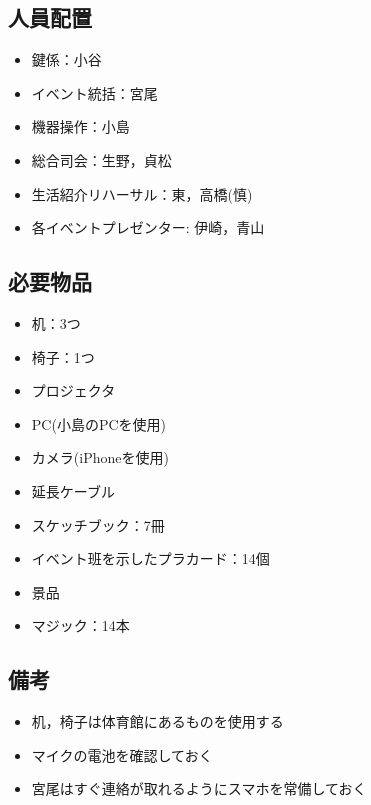 \subsection{人員配置}
\begin{itemize}
\item 鍵係：小谷
\item イベント統括：宮尾
\item 機器操作：小島
\item 総合司会：生野，貞松
\item 生活紹介リハーサル：東，高橋(慎)
\item 各イベントプレゼンター: 伊崎，青山
\end{itemize}




\subsection{必要物品}
\begin{itemize}
\item 机：3つ
\item 椅子：1つ
\item プロジェクタ
\item PC(小島のPCを使用)
\item カメラ(iPhoneを使用)
\item 延長ケーブル
\item スケッチブック：7冊
\item イベント班を示したプラカード：14個
\item 景品
\item マジック：14本
\end{itemize}


\subsection{備考}
\begin{itemize}
\item 机，椅子は体育館にあるものを使用する
\item マイクの電池を確認しておく
\item 宮尾はすぐ連絡が取れるようにスマホを常備しておく
\end{itemize}

%

